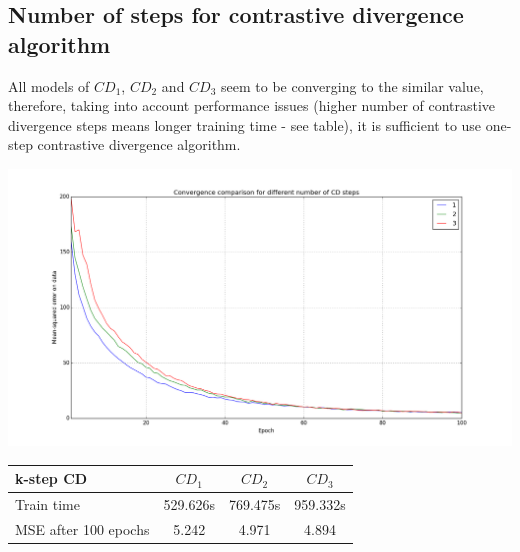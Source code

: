 \documentclass[a4paper]{scrartcl}
\begin{document}
\subsection{Number of steps for contrastive divergence algorithm}
All models of $CD_1$, $CD_2$ and $CD_3$ seem to be converging to the similar value, therefore, taking into account performance issues (higher number of contrastive divergence steps means longer training time - see table), it is sufficient to use one-step contrastive divergence algorithm.
\begin{center}
\includegraphics[width=14cm]{images/CDk.png}
\end{center}
\hspace{1cm}
\begin{tabular}{|l||c|c|c|} \hline
k-step CD & $CD_1$ & $CD_2$ & $CD_3$ 
\\ \hline
Train time & 529.626s & 769.475s & 959.332s 
\\ \hline
MSE after 100 epochs & 5.242 & 4.971 & 4.894 
\\ \hline \end{tabular}
\end{document}

